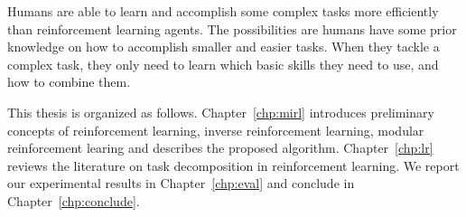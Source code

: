 Humans are able to learn and accomplish some complex tasks more efficiently than
reinforcement learning agents. The possibilities are humans have some prior
knowledge on how to accomplish smaller and easier tasks. When they tackle a
complex task, they only need to learn which basic skills they need to use, and
how to combine them.

This thesis is organized as follows. Chapter~\ref{chp:mirl} introduces 
preliminary concepts of reinforcement learning, inverse reinforcement learning,
modular reinforcement learing and describes the proposed algorithm.
Chapter~\ref{chp:lr} reviews the literature on task decomposition in
reinforcement learning. We report our experimental results in
Chapter~\ref{chp:eval} and conclude in Chapter~\ref{chp:conclude}.
